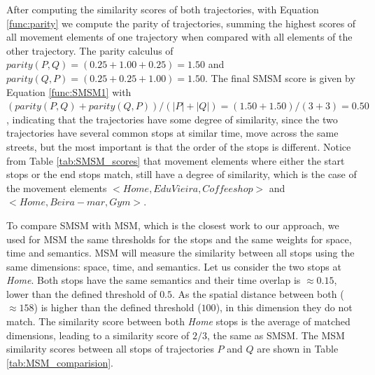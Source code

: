 \documentclass[12pt]{article}
\begin{document}
After  computing the similarity scores of both trajectories, with Equation \ref{func:parity} we compute the parity of trajectories, summing the highest scores of all movement elements of one trajectory when compared with all elements of the other trajectory. The parity calculus of $parity(P, Q) = (0.25 + 1.00 + 0.25) = 1.50$ and $parity(Q, P) = (0.25 + 0.25 + 1.00) = 1.50$.
The final SMSM score is given by Equation \ref{func:SMSM1} with $(parity(P, Q) + parity(Q, P)) / (|P| + |Q|) = (1.50 + 1.50) / (3 + 3) = 0.50$, indicating that the trajectories have some degree of similarity, since the two trajectories have several common stops at similar time, move across the same streets, but the most important is that the order of the stops is different. Notice from Table \ref{tab:SMSM_scores} that movement elements where either the start stops or the end stops match, still have a degree of similarity, which is the case of the movement elements $<Home, Edu Vieira, Coffee shop>$ and $<Home, Beira-mar, Gym>$.

{To compare SMSM with MSM, which is the closest work to our approach, we used for MSM the same thresholds for the stops and the same weights for space, time and semantics.}
MSM will measure the similarity between all stops using the same dimensions: space, time, and semantics. Let us consider the two stops at \textit{Home}. Both stops have the same semantics and their time overlap is $\approx 0.15$, lower than the defined threshold of $0.5$. As the spatial distance between both ($\approx 158$) is higher than the defined threshold ($100$), in this dimension they do not match. The similarity score between both \textit{Home} stops is the average of matched dimensions, leading to a similarity score of $2/3$, the same as SMSM. The MSM similarity scores between all stops of trajectories $P$ and $Q$ are shown in Table \ref{tab:MSM_comparision}.
\end{document}
